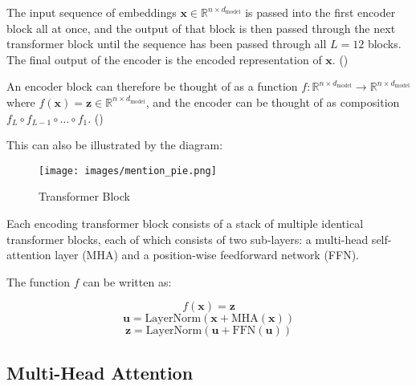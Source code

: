 
The input sequence of embeddings
$\mathbf{x} \in \mathbb{R}^{n \times d_{\text{model}}}$ is passed into the first encoder block all at once, and the output of that block is then passed through the next transformer block until the sequence has been passed through all $L = 12$ blocks. The final output of the encoder is the encoded representation of $\mathbf{x}$. (\cite{thickstun_transformer_2020})

An encoder block can therefore be thought of as a function $f: \mathbb{R}^{n \times d_{\text{model}}} \rightarrow \mathbb{R}^{n \times d_{\text{model}}}$
where $f(\mathbf{x}) = \mathbf{z} \in \mathbb{R}^{n \times d_{\text{model}}}$, and the encoder can be thought of as composition $f_L \circ f_{L-1} \circ \dots \circ f_1$. (\cite{thickstun_transformer_2020})

This can also be illustrated by the diagram:

\begin{figure}[H]
    \centering
    \texttt{[image: images/mention\_pie.png]}
    \caption{Transformer Block}
    \label{fig:transformer-block}
\end{figure}

Each encoding transformer block consists of a stack of multiple identical transformer blocks, each of which consists of two sub-layers: a multi-head self-attention layer (MHA) and a position-wise feedforward network (FFN). \cite{vaswani_attention_2017}

The function $f$ can be written as:

$$f(\mathbf{x}) = \mathbf{z}$$
\begin{equation} \label{sublayer1}
    \mathbf{u}= \text{LayerNorm}(\mathbf{\mathbf{x}} + \text{MHA}(\mathbf{x}))
\end{equation}
\begin{equation} \label{sublayer2}
    \mathbf{z} = \text{LayerNorm}(\mathbf{u} + \text{FFN}(\mathbf{\mathbf{u}}))
\end{equation}

\subsection{Multi-Head Attention}

